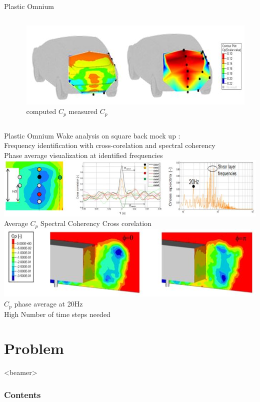 \documentclass{beamer}
\begin{document}
\begin{frame}{Plastic Omnium}
\begin{columns}[onlytextwidth]
\begin{column}{0.5\textwidth}
    \end{column}
    \begin{column}{0.5\textwidth}
      \includegraphics[scale=0.6]{image1-3} \\
      \quad computed $C_p$ \quad measured $C_p$
    \end{column}
  \end{columns}
\end{frame}

\begin{frame}{Plastic Omnium}
  Wake analysis on square back mock up :\\
  Frequency identification with cross-corelation and spectral coherency\\
  Phase average visualization at identified frequencies\\
  \includegraphics[scale=0.7]{image2-1}\\
  \quad \small Average $C_p$ \quad\quad\quad Spectral Coherency \quad\quad\quad Cross corelation\\
  \includegraphics[scale=0.7]{image2-2}\\
  \quad\quad\quad\quad $C_p$ phase average at 20Hz\\
  High Number of time steps needed
\end{frame}

\section{Problem}
\begin{frame}<beamer>
  \frametitle{Contents}
  \tableofcontents[currentsection]
\end{frame}
\end{document}

